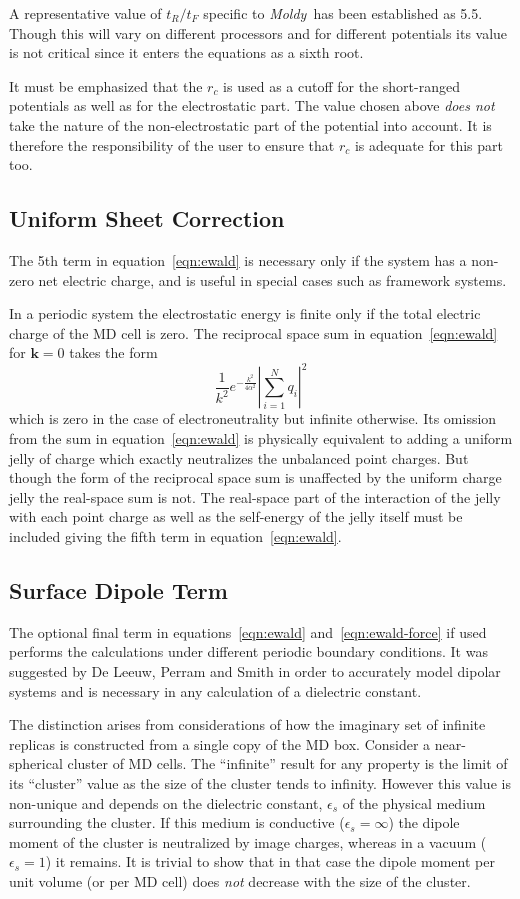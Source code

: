 \documentclass[a4paper,twoside]{report}
\newcommand{\bm}[1]{\mathbf{#1}}
\newcommand{\moldy}{\emph{Moldy}}
\begin{document}
A representative value of $t_R/t_F$ specific to \moldy\ has been
established as 5.5.  Though this will vary on different processors
and for different potentials its value is not critical since it
enters the equations as a sixth root.  

It must be emphasized that the $r_c$ is used as a cutoff for the
short-ranged potentials as well as for the electrostatic part.  The
value chosen above \emph{does not} take the nature of the
non-electrostatic part of the potential into account.  It is therefore
the responsibility of the user to ensure that $r_c$ is adequate for
this part too.

\subsection{Uniform Sheet Correction}
The 5th term in equation~\ref{eqn:ewald} is necessary only if the system
has a non-zero net electric charge, and is useful in special cases such
as framework systems.  

In a periodic system the electrostatic energy is finite only if the
total electric charge of the MD cell is zero.  The reciprocal space
sum in equation~\ref{eqn:ewald} for $\bm{k}=0$ takes the form
\[\frac{1}{k^2}e^{-\frac{k^2}{4 \alpha^2}} \left | \sum_{i=1}^{N} q_i
 \right |^2\] which is zero in the case of electroneutrality but
infinite otherwise.  Its omission from the sum in
equation~\ref{eqn:ewald} is physically equivalent to adding a uniform
jelly of charge which exactly neutralizes the unbalanced point
charges.  But though the form of the reciprocal space sum is
unaffected by the uniform charge jelly the real-space sum is not.  The
real-space part of the interaction of the jelly with each point charge
as well as the self-energy of the jelly itself must be included giving
the fifth term in equation~\ref{eqn:ewald}.

\subsection{Surface Dipole Term}
The optional final term in equations~\ref{eqn:ewald} 
and~\ref{eqn:ewald-force} if used performs the calculations under
different periodic boundary conditions.  It was suggested by De Leeuw,
Perram and Smith\cite{deleeuw:80} in order to accurately model
dipolar systems and is necessary in any calculation of a dielectric
constant. 

The distinction arises from considerations of how the imaginary set of
infinite replicas is constructed from a single copy of the MD 
box\cite[pp 156-159]{allen:87}.  Consider a near-spherical cluster
of MD cells.  The ``infinite'' result for any property is the limit of
its ``cluster'' value as the size of the cluster tends to infinity.
However this value is non-unique and depends on the dielectric
constant, $\epsilon_s$ of the physical medium surrounding the cluster.
If this medium is conductive ($\epsilon_s=\infty$) the dipole
moment of the cluster is neutralized by image charges, whereas in a
vacuum ($\epsilon_s=1$) it remains.  It is trivial to show that
in that case the dipole moment per unit volume (or per MD cell) does
\emph{not} decrease with the size of the cluster.
\end{document}

